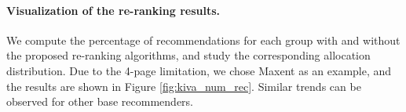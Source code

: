 





\paragraph{Visualization of the re-ranking results.} We compute the percentage of recommendations for each group with and without the proposed re-ranking algorithms, and study the corresponding allocation distribution. Due to the 4-page limitation, we chose Maxent as an example, and the results are shown in Figure \ref{fig:kiva_num_rec}. Similar trends can be observed for other base recommenders.

